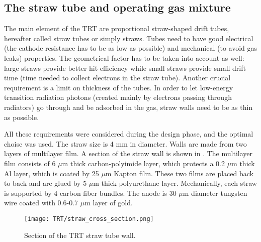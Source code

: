 \subsection{The straw tube and operating gas mixture}

The main element of the TRT are proportional straw-shaped drift tubes, hereafter called straw tubes or simply straws.
Tubes need to have good electrical (the cathode resistance has to be as low as possible) and mechanical (to avoid gas leaks) properties.
The geometrical factor has to be taken into account as well: large straws provide better hit efficiency while small straws provide small drift time (time needed to collect electrons in the straw tube).
Another crucial requirement is a limit on thickness of the tubes. 
In order to let low-energy transition radiation photons (created mainly by electrons passing through radiators) go through and be adsorbed in the gas, straw walls need to be as thin as possible.

All these requirements were considered during the design phase, and the optimal choise was used.
The straw size is 4 mm in diameter. Walls are made from two layers of multilayer film. A section of the straw wall is shown in .
The multilayer film consists of 6 $\mu$m thick carbon-polyimide layer, which protects a 0.2 $\mu$m thick Al layer, which is coated by 25 $\mu$m Kapton film.
These two films are placed back to back and are glued by 5 $\mu$m thick polyurethane layer.
Mechanically, each straw is supported by 4 carbon fiber bundles.
The anode is 30 $\mu$m diameter tungsten wire coated with 0.6-0.7 $\mu$m layer of gold.

\begin{figure}
\centering
\texttt{[image: TRT/straw\_cross\_section.png]}
\caption{ 
Section of the TRT straw tube wall.
}
\label{fig:straw_wall_section}
\end{figure}

